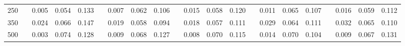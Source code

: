 % 
\begin{tabular}{ccccccccccccccccccccc}
  \hline
  \hline
250 &  & 0.005 & 0.054 & 0.133 &  & 0.007 & 0.062 & 0.106 &  & 0.015 & 0.058 & 0.120 &  & 0.011 & 0.065 & 0.107 &  & 0.016 & 0.059 & 0.112 \\ 
  350 &  & 0.024 & 0.066 & 0.147 &  & 0.019 & 0.058 & 0.094 &  & 0.018 & 0.057 & 0.111 &  & 0.029 & 0.064 & 0.111 &  & 0.032 & 0.065 & 0.110 \\ 
  500 &  & 0.003 & 0.074 & 0.128 &  & 0.009 & 0.068 & 0.127 &  & 0.008 & 0.070 & 0.115 &  & 0.014 & 0.070 & 0.104 &  & 0.009 & 0.067 & 0.131 \\ 
   \hline
\end{tabular}
